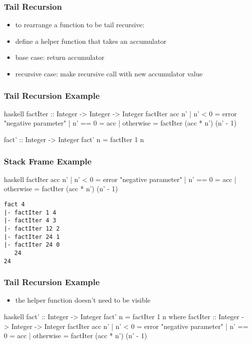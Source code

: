 \documentclass[dvipsnames]{beamer}
\theoremstyle{plain}
\begin{document}
\begin{frame}
  \frametitle{Tail Recursion}

  \begin{itemize}
    \item to rearrange a function to be tail recursive:

    \medskip
    \item define a helper function that takes an \alert{accumulator}
    \item base case: return accumulator
    \item recursive case: make recursive call with new accumulator value
  \end{itemize}
\end{frame}

\begin{frame}[fragile]
  \frametitle{Tail Recursion Example}

  \begin{exampleblock}{}
    \begin{pygments}{haskell}
factIter :: Integer -> Integer -> Integer
factIter acc n'
  | n' < 0    = error "negative parameter"
  | n' == 0   = acc
  | otherwise = factIter (acc * n') (n' - 1)

fact' :: Integer -> Integer
fact' n = factIter 1 n
    \end{pygments}
  \end{exampleblock}
\end{frame}

\begin{frame}[fragile]
  \frametitle{Stack Frame Example}

  \begin{exampleblock}{}
    \begin{pygments}{haskell}
factIter acc n'
  | n' < 0    = error "negative parameter"
  | n' == 0   = acc
  | otherwise = factIter (acc * n') (n' - 1)
    \end{pygments}

    \begin{verbatim}
fact 4
|- factIter 1 4
|- factIter 4 3
|- factIter 12 2
|- factIter 24 1
|- factIter 24 0
   24
24
    \end{verbatim}
  \end{exampleblock}
\end{frame}

\begin{frame}[fragile]
  \frametitle{Tail Recursion Example}

  \begin{itemize}
    \item the helper function doesn't need to be visible
  \end{itemize}

  \begin{exampleblock}{}
    \begin{pygments}{haskell}
fact' :: Integer -> Integer
fact' n = factIter 1 n
  where
    factIter :: Integer -> Integer -> Integer
    factIter acc n'
      | n' < 0    = error "negative parameter"
      | n' == 0   = acc
      | otherwise = factIter (acc * n') (n' - 1)
    \end{pygments}
  \end{exampleblock}
\end{frame}
\end{document}
